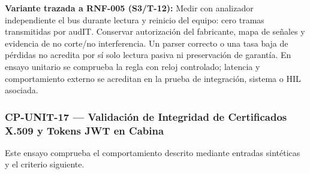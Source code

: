 \par\noindent\textbf{Variante trazada a RNF-005 (S3/T-12):} Medir con analizador independiente el bus durante lectura y reinicio del equipo: cero tramas transmitidas por audIT. Conservar autorización del fabricante, mapa de señales y evidencia de no corte/no interferencia. Un parser correcto o una tasa baja de pérdidas no acredita por sí solo lectura pasiva ni preservación de garantía. En ensayo unitario se comprueba la regla con reloj controlado; latencia y comportamiento externo se acreditan en la prueba de integración, sistema o HIL asociada.\par


\subsubsection*{CP-UNIT-17 — Validación de Integridad de Certificados X.509 y Tokens JWT en Cabina}\label{sec:9-cp-unit-17}
Este ensayo comprueba el comportamiento descrito mediante entradas sintéticas y el criterio siguiente.

